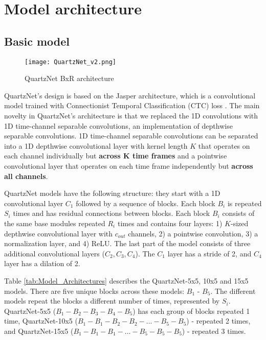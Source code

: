 \documentclass{article}
\begin{document}
\section{Model architecture}
\label{sec:pagestyle}
\subsection{Basic model}
\begin{figure}[t]
 \centering
 \texttt{[image: QuartzNet\_v2.png]}
 \caption{QuartzNet BxR architecture}
 \label{fig:quartz_arch}
\end{figure}

QuartzNet's design is based on the Jasper \cite{li2019jasper} architecture, which is a convolutional model trained with Connectionist Temporal Classification (CTC) loss \cite{graves2006}. The main novelty in QuartzNet's architecture is that we replaced the 1D convolutions with 1D time-channel separable convolutions, an implementation of depthwise separable convolutions. 1D time-channel separable convolutions can be separated into a 1D depthwise convolutional layer with kernel length $K$ that operates on each channel individually but \textbf{across $\pmb{K}$ time frames} and a pointwise convolutional layer that operates on each time frame independently but \textbf{across all channels}.

QuartzNet models have the following structure: they start with a 1D convolutional layer $C_1$ followed by a sequence of blocks. Each block $B_i$ is repeated $S_i$ times and has residual connections between blocks. Each block $B_i$ consists of the same base modules repeated $R_i$ times and contains four layers: 1) $K$-sized depthwise convolutional layer with $c_{out}$ channels, 2) a pointwise convolution, 3) a normalization layer, and 4) ReLU.  
The last part of the model consists of three additional convolutional layers ($C_2, C_3, C_4$). The $C_1$ layer has a stride of 2, and $C_4$ layer has a dilation of 2. 

Table \ref{tab:Model_Architectures} describes the QuartzNet-5x5, 10x5 and 15x5 models. There are five unique blocks across these models: $B_1$ - $B_5$. The different models repeat the blocks a different number of times, represented by $S_i$. QuartzNet-5x5 ($B_1-B_2-B_3-B_4-B_5$) has each group of blocks repeated 1 time, QuartzNet-10x5 ($B_1-B_1-B_2-B_2-...-B_5-B_5$) - repeated 2 times, and QuartzNet-15x5 ($B_1-B_1-B_1-...-B_5-B_5-B_5$) - repeated 3 times.
\end{document}
